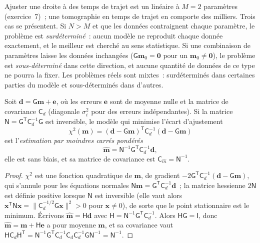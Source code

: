 Ajuster une droite à des temps de trajet est un  linéaire à
$M = 2$ paramètres (exercice~7)~; une tomographie en temps de trajet en comporte des
milliers. Trois cas se présentent. Si $N > M$ et que les données contraignent chaque
paramètre, le problème est \emph{surdéterminé}~: aucun modèle ne reproduit chaque
donnée exactement, et le meilleur est cherché au sens statistique. Si une combinaison de
paramètres laisse les données inchangées ($\mathsf G\mathbf m_0 = \mathbf 0$ pour
un $\mathbf m_0 \ne \mathbf 0$), le problème est \emph{sous-déterminé} dans cette
direction, et aucune quantité de données de ce type ne pourra la fixer. Les problèmes réels sont
mixtes~: surdéterminés dans certaines parties du modèle et sous-déterminés dans
d'autres.

\begin{theorem}\label{thm:b3:seismology-imaging:wls}
Soit $\mathbf d = \mathsf G\mathbf m + \mathbf e$, où les erreurs $\mathbf e$
sont de moyenne nulle et la matrice de covariance $\mathsf C_d$ (diagonale
$\sigma_i^2$ pour des erreurs indépendantes). Si la matrice
$\mathsf N = \mathsf G^{\mathsf T}\mathsf C_d^{-1}\mathsf G$ est inversible, le
modèle qui minimise l'écart d'ajustement
\[
  \chi^2(\mathbf m) = (\mathbf d - \mathsf G\mathbf m)^{\mathsf T}\mathsf C_d^{-1}
  (\mathbf d - \mathsf G\mathbf m)
\]
est l'\emph{estimation par moindres carrés pondérés}
\[
  \hat{\mathbf m} = \mathsf N^{-1}\mathsf G^{\mathsf T}\mathsf C_d^{-1}\mathbf d ,
\]
elle est sans biais, et sa matrice de covariance est
$\mathsf C_{\hat m} = \mathsf N^{-1}$.
\end{theorem}

\begin{proof}
$\chi^2$ est une fonction quadratique de $\mathbf m$, de gradient
$-2\mathsf G^{\mathsf T}\mathsf C_d^{-1}(\mathbf d - \mathsf G\mathbf m)$, qui
s'annule pour les équations normales $\mathsf N\mathbf m = \mathsf G^{\mathsf T}
\mathsf C_d^{-1}\mathbf d$~; la matrice hessienne $2\mathsf N$ est définie positive lorsque
$\mathsf N$ est inversible (elle vaut alors $\mathbf x^{\mathsf T}\mathsf N\mathbf x =
\|\mathsf C_d^{-1/2}\mathsf G\mathbf x\|^2 > 0$ pour $\mathbf x \ne 0$), de sorte que le
point stationnaire est le minimum. Écrivons $\hat{\mathbf m} = \mathsf H\mathbf d$ avec
$\mathsf H = \mathsf N^{-1}\mathsf G^{\mathsf T}\mathsf C_d^{-1}$. Alors
$\mathsf H\mathsf G = \mathsf I$, donc $\hat{\mathbf m} = \mathbf m + \mathsf H\mathbf e$
a pour moyenne $\mathbf m$, et sa covariance vaut
$\mathsf H\mathsf C_d\mathsf H^{\mathsf T} =
\mathsf N^{-1}\mathsf G^{\mathsf T}\mathsf C_d^{-1}\mathsf C_d\mathsf C_d^{-1}
\mathsf G\mathsf N^{-1} = \mathsf N^{-1}$.
\end{proof}

